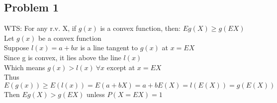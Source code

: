 \documentclass{article}
\begin{document}
\begin{flushleft}
\section*{Problem 1}
WTS: For any r.v. X, if $g(x)$ is a convex function, then: $Eg(X)\geq g(EX)$\\
Let $g(x)$ be a convex function\\
Suppose $l(x)=a+bx$ is a line tangent to $g(x)$ at $x=EX$\\
Since g is convex, it lies above the line $l(x)$\\
Which means $g(x)>l(x) \ \forall x$ except at $x=EX$\\
Thus $E(g(x))\geq E(l(x))=E(a+bX)=a+bE(X)=l(E(X))=g(E(X))$\\
Then $Eg(X)>g(EX)$ unless $P(X=EX)=1$\\

\end{flushleft}
\end{document}
